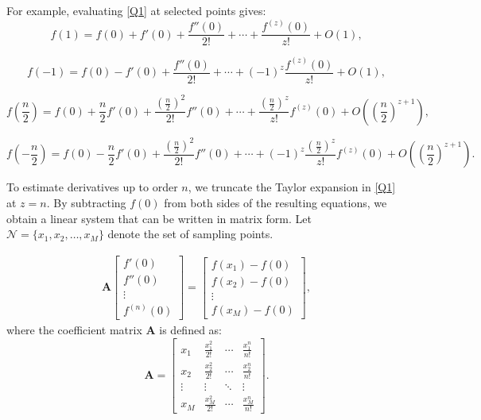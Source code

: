 \documentclass{elsarticle}
\begin{document}
For example, evaluating \eqref{Q1} at selected points gives:
\begin{equation}\label{Q3}
	f(1) = f(0) + f'(0) + \frac{f''(0)}{2!} + \cdots + \frac{f^{(z)}(0)}{z!} + O(1),
\end{equation}

\begin{equation}\label{Q4}
	f(-1) = f(0) - f'(0) + \frac{f''(0)}{2!} + \cdots + (-1)^z \frac{f^{(z)}(0)}{z!} + O(1),
\end{equation}

\begin{equation}\label{Q5}
	f\left(\frac{n}{2}\right) = f(0) + \frac{n}{2} f'(0) + \frac{\left(\frac{n}{2}\right)^2}{2!} f''(0) + \cdots + \frac{\left(\frac{n}{2}\right)^z}{z!} f^{(z)}(0) + O\left(\left(\frac{n}{2}\right)^{z+1}\right),
\end{equation}

\begin{equation}\label{Q6}
	f\left(-\frac{n}{2}\right) = f(0) - \frac{n}{2} f'(0) + \frac{\left(\frac{n}{2}\right)^2}{2!} f''(0) + \cdots + (-1)^z \frac{\left(\frac{n}{2}\right)^z}{z!} f^{(z)}(0) + O\left(\left(\frac{n}{2}\right)^{z+1}\right).
\end{equation}

To estimate derivatives up to order $n$, we truncate the Taylor expansion in \eqref{Q1} at $z = n$. By subtracting $f(0)$ from both sides of the resulting equations, we obtain a linear system that can be written in matrix form. Let $\mathcal{N} = \{x_1, x_2, \dots, x_M\}$ denote the set of sampling points.

\begin{equation}\label{Q9}
	\begin{aligned}
		\mathbf{A}
		\begin{bmatrix}
			f'(0) \\
			f''(0) \\
			\vdots \\
			f^{(n)}(0)
		\end{bmatrix}
		=
		\begin{bmatrix}
			f(x_1)-f(0) \\
			f(x_2)-f(0) \\
			\vdots \\
			f(x_M)-f(0)
		\end{bmatrix},
	\end{aligned}
\end{equation}
where the coefficient matrix $\mathbf{A}$ is defined as:
\[
\mathbf{A} =
\begin{bmatrix}
	x_1 & \frac{x_1^2}{2!} & \cdots & \frac{x_1^n}{n!} \\
	x_2 & \frac{x_2^2}{2!} & \cdots & \frac{x_2^n}{n!} \\
	\vdots & \vdots & \ddots & \vdots \\
	x_M & \frac{x_M^2}{2!} & \cdots & \frac{x_M^n}{n!}
\end{bmatrix}.
\]
\end{document}
